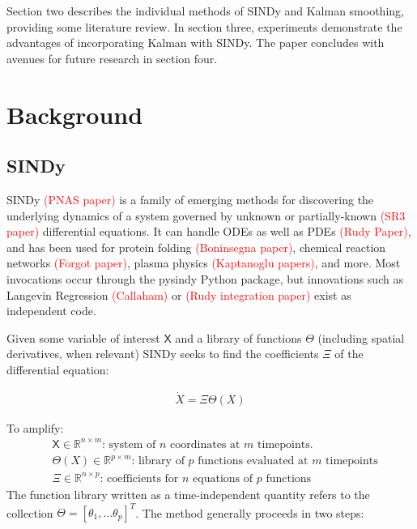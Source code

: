 \documentclass{article}
\newcommand{\red}[1]{\textcolor{red}{#1}}
\newcommand{\mat}[1]{\boldsymbol{\mathsf{#1}}}
\newcommand{\R}[1]{\mathbb{R}^{#1}}
\begin{document}
Section two describes the individual methods of SINDy and Kalman smoothing, providing some literature review.  In section three, experiments demonstrate the advantages of incorporating Kalman with SINDy.  The paper concludes with avenues for future research in section four.


\section{Background}

\subsection{SINDy}
SINDy \red{(PNAS paper)} is a family of emerging methods for discovering the underlying dynamics of a system governed by unknown or partially-known \red{(SR3 paper)} differential equations.  It can handle ODEs as well as PDEs \red{(Rudy Paper)}, and has been used for protein folding \red{(Boninsegna paper)}, chemical reaction networks \red{(Forgot paper)}, plasma physics \red{(Kaptanoglu papers)}, and more.  Most invocations occur through the pysindy Python package, but innovations such as Langevin Regression \red{(Callaham)} or \red{(Rudy integration paper)} exist as independent code.

Given some variable of interest $\mat X$ and a library of functions $\mat \Theta$ (including spatial derivatives, when relevant) SINDy seeks to find the coefficients $\mat \Xi$ of the differential equation:

\begin{align}
    \label{eqn:sindy_ode}
    \dot X = \Xi\Theta(X)
\end{align}

To amplify:
\begin{align*}
    &\mat X \in \R{n \times m}\text{: system of $n$ coordinates at $m$ timepoints.}\\
    &\mat \Theta(X) \in \R{p \times m}\text{: library of $p$ functions evaluated at $m$ timepoints}\\
    &\mat \Xi \in \R{n \times p}\text{: coefficients for $n$ equations of $p$ functions}
\end{align*}
The function library written as a time-independent quantity refers to the collection $\mat \Theta = [\theta_1, \dots \theta_p]^T$.
The method generally proceeds in two steps: 
\end{document}

